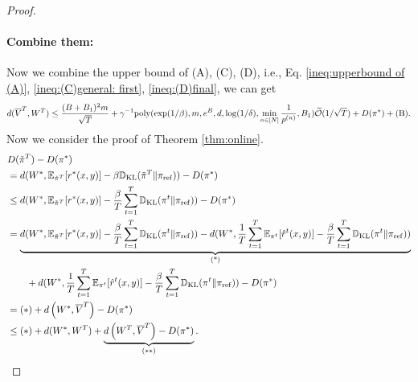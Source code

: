 \begin{proof}
 \paragraph{Combine them:} Now we combine the upper bound of (A), (C), (D), i.e., Eq. \eqref{ineq:upperbound of (A)}, \eqref{ineq:(C)general: first}, \eqref{ineq:(D)final}, we can get 
 \begin{align}
     d(\overline{V}^T, W^T) \le \frac{(B+B_1)^2m}{\sqrt{T}} + \gamma^{-1}\mathrm{poly}(\exp(1/\beta), m, e^B, d, \log(1/\delta), \min_{n \in [N]}\frac{1}{p^{(n)}}, B_1)\widetilde{\mathcal{O}}(1/\sqrt{T}) + D(\pi^*) + \textrm{(B)}. \label{eq:second step}
 \end{align}
 Now we consider the proof of Theorem \ref{thm:online}. 
\begin{align*}
    &D(\tilde{\pi}^T) - D(\pi^*) \\ &= d(W^*, \mathbb{E}_{\tilde{\pi}^T}[r^*(x,y)]-\beta \mathbb{D}_{\mathrm{KL}}(\tilde{\pi}^T\| \pi_{\mathrm{ref}})) - D(\pi^*)\\
    &\le d(W^*, \mathbb{E}_{\tilde{\pi}^T}[r^*(x,y)]-\frac{\beta}{T} \sum_{t=1}^T \mathbb{D}_{\mathrm{KL}}(\pi^t\|\pi_{\mathrm{ref}})) - D(\pi^*)\\
    &= \underbrace{d(W^*, \mathbb{E}_{\tilde{\pi}^T}[r^*(x,y)]-\frac{\beta}{T} \sum_{t=1}^T \mathbb{D}_{\mathrm{KL}}(\pi^t\|\pi_{\mathrm{ref}})) - d(W^*, \frac{1}{T}\sum_{t=1}^T\mathbb{E}_{\pi^t}[\hat{r}^t(x,y)]-\frac{\beta}{T} \sum_{t=1}^T \mathbb{D}_{\mathrm{KL}}(\pi^t\|\pi_{\mathrm{ref}}))}_{\textrm{(*)}} \\
    &\qquad + d(W^*, \frac{1}{T}\sum_{t=1}^T \mathbb{E}_{\pi^t}[\hat{r}^t(x,y)]-\frac{\beta}{T} \sum_{t=1}^T \mathbb{D}_{\mathrm{KL}}(\pi^t\|\pi_{\mathrm{ref}})) - D(\pi^*)\\
    &=\mathrm{(*)}
    + d\left(W^*, \overline{V}^T\right) - D(\pi^*)\\
    &\le \mathrm{(*)}+ d(W^*, W^T)
    + \underbrace{d\left(W^T, \overline{V}^T\right)  - D(\pi^*)}_{\mathrm{(**)}}.
\end{align*}

\end{proof}
